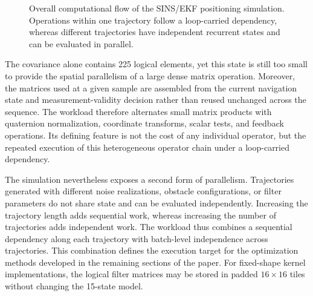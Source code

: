 \begin{figure}[!t]
  \caption{Overall computational flow of the SINS/EKF positioning simulation. Operations within one trajectory follow a loop-carried dependency, whereas different trajectories have independent recurrent states and can be evaluated in parallel.}
  \label{fig:computational-flow}
\end{figure}

The covariance alone contains 225 logical elements, yet this state is still too small to provide the spatial parallelism of a large dense matrix operation. Moreover, the matrices used at a given sample are assembled from the current navigation state and measurement-validity decision rather than reused unchanged across the sequence. The workload therefore alternates small matrix products with quaternion normalization, coordinate transforms, scalar tests, and feedback operations. Its defining feature is not the cost of any individual operator, but the repeated execution of this heterogeneous operator chain under a loop-carried dependency.

The simulation nevertheless exposes a second form of parallelism. Trajectories generated with different noise realizations, obstacle configurations, or filter parameters do not share state and can be evaluated independently. Increasing the trajectory length adds sequential work, whereas increasing the number of trajectories adds independent work. The workload thus combines a sequential dependency along each trajectory with batch-level independence across trajectories. This combination defines the execution target for the optimization methods developed in the remaining sections of the paper. For fixed-shape kernel implementations, the logical filter matrices may be stored in padded $16\times16$ tiles without changing the 15-state model.
